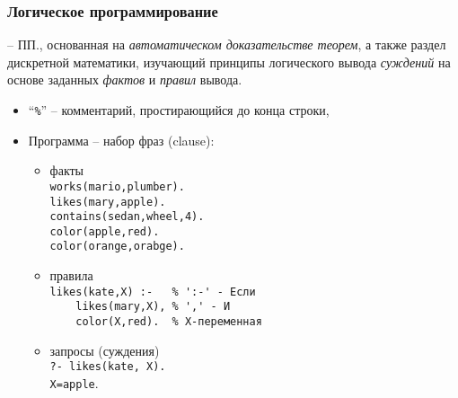 \documentclass[10pt]{beamer}
\begin{document}
\begin{frame}[fragile]
  \frametitle{Логическое программирование}
  -- ПП., основанная на \emph{автоматическом доказательстве теорем}, а также раздел дискретной математики, изучающий принципы логического вывода \emph{суждений} на основе заданных \emph{фактов} и \emph{правил} вывода.
  \begin{itemize}
  \item ``\verb|%|'' -- комментарий, простирающийся до конца строки,
  \item Программа -- набор фраз (clause):
    \begin{itemize}
    \item факты \\ \verb|works(mario,plumber).|\\\verb|likes(mary,apple).|\\ \verb|contains(sedan,wheel,4).|\\
      \verb|color(apple,red).|\\
      \verb|color(orange,orabge).|
    \item правила \\ \verb|likes(kate,X) :-   % ':-' - Если |\\
      \verb|    likes(mary,X), % ',' - И |\\
      \verb|    color(X,red).  % X-переменная|
    \item запросы (суждения) \\ \verb|?- likes(kate, X).|\\\verb|X=apple|.
    \end{itemize}
  \end{itemize}
\end{frame}
\end{document}
